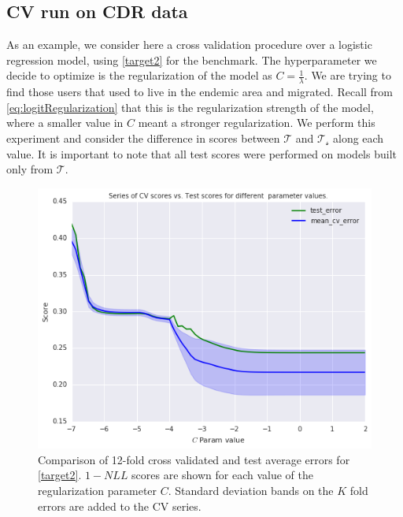 \subsection{CV run on CDR data}\label{subsection:cvExperiment}

As an example, we consider here a cross validation procedure over a logistic regression model, using \cref{target2} for the benchmark.
The hyperparameter we decide to optimize is the regularization of the model as $C = \frac{1}{\lambda}$.
We are trying to find those users that used to live in the endemic area and migrated.
Recall from \cref{eq:logitRegularization} that this is the regularization strength of the model, where a smaller value in $C$ meant a stronger regularization.
We perform this experiment and consider the difference in scores between  $\mathcal{T}$ and $\mathcal{T_s}$ along each value.
It is important to note that all test scores were performed on models built only from $\mathcal{T}$.


\begin{figure}[h!]
\begin{center}
\includegraphics[width=1\columnwidth]{figures/cross_validation/train_and_cv_score_comparison_logreg.jpg}
\caption{ Comparison of 12-fold cross validated and test average errors for \cref{target2}.   $1-NLL$ scores are shown for each value of the regularization parameter $C$. Standard deviation bands on the $K$ fold errors are added to the CV series.}
\label{fig:cv_vs_test_score}
\end{center}
\end{figure}

